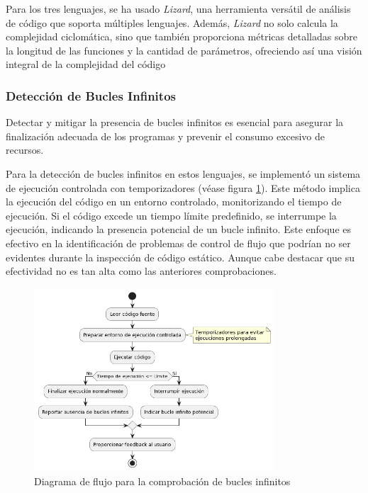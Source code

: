 Para los tres lenguajes, se ha usado \textit{Lizard}, una herramienta versátil de análisis de código que soporta múltiples lenguajes. Además, \textit{Lizard} no solo calcula la complejidad ciclomática, sino que también proporciona métricas detalladas sobre la longitud de las funciones y la cantidad de parámetros, ofreciendo así una visión integral de la complejidad del código

\subsubsection*{Detección de Bucles Infinitos}
Detectar y mitigar la presencia de bucles infinitos es esencial para asegurar la finalización adecuada de los programas y prevenir el consumo excesivo de recursos.

Para la detección de bucles infinitos en estos lenguajes, se implementó un sistema de ejecución controlada con temporizadores (véase figura \ref{fig:comprobaciones}). Este método implica la ejecución del código en un entorno controlado, monitorizando el tiempo de ejecución. Si el código excede un tiempo límite predefinido, se interrumpe la ejecución, indicando la presencia potencial de un bucle infinito. Este enfoque es efectivo en la identificación de problemas de control de flujo que podrían no ser evidentes durante la inspección de código estático. Aunque cabe destacar que su efectividad no es tan alta como las anteriores comprobaciones. 

\begin{figure}[H]
    \centering
    \includegraphics[width=0.8\textwidth]{imagenes/buclesinfinitos.png}
    \caption{Diagrama de flujo para la comprobación de bucles infinitos}
    \label{fig:comprobaciones}
\end{figure}

